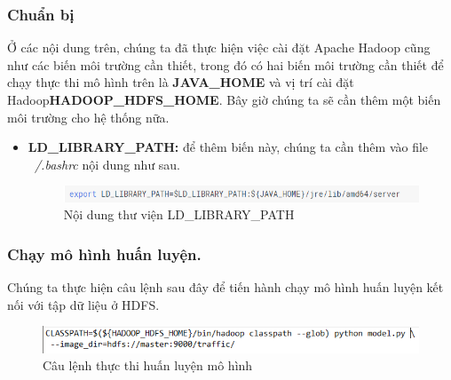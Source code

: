 	\subsubsection{Chuẩn bị}
	Ở các nội dung trên, chúng ta đã thực hiện việc cài đặt Apache Hadoop cũng như các biến môi trường cần thiết, trong đó có hai biến môi trường cần thiết để chạy thực thi mô hình trên là \textbf{JAVA\_HOME} và vị trí cài đặt Hadoop\textbf{HADOOP\_HDFS\_HOME}. Bây giờ chúng ta sẽ cần thêm một biến môi trường cho hệ thống nữa.
	\begin{itemize}
		\item \textbf{LD\_LIBRARY\_PATH: }để thêm biến này, chúng ta cần thêm vào file \textit{~/.bashrc} nội dung như sau.	
	\begin{figure}[h!]
			\centering
			\includegraphics[scale=0.8]{charts/ldlib.png}
			\caption{Nội dung thư viện LD\_LIBRARY\_PATH}
	\end{figure}
		
	\end{itemize}
	\subsubsection{Chạy mô hình huấn luyện.}
	Chúng ta thực hiện câu lệnh sau đây để tiến hành chạy mô hình huấn luyện kết nối với tập dữ liệu ở HDFS.
	\begin{figure}[h!]
			\centering
			\includegraphics[scale=0.8]{charts/run.png}
			\caption{Câu lệnh thực thi huấn luyện mô hình}
	\end{figure}

